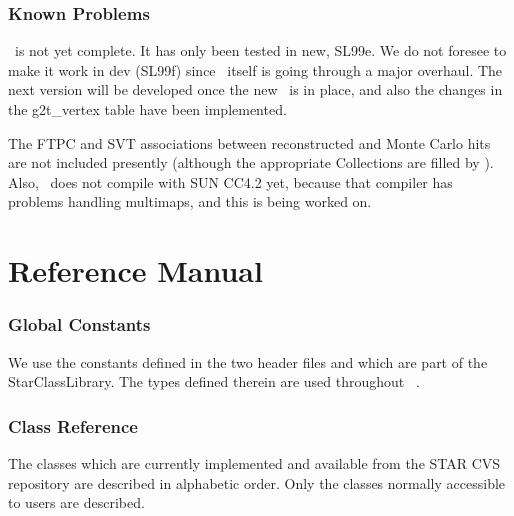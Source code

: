 \section{Known Problems} 

\StAssociationMaker\ is not yet complete.  
It has only been tested in new, SL99e.  We do not foresee
to make it work in dev (SL99f) since \StEvent\ itself is going through a major
overhaul.  The next version will be developed once the new \StEvent\
is in place, and also the changes in the g2t\_vertex table have been
implemented.

The FTPC and SVT associations between reconstructed and Monte Carlo
hits are not included presently (although the appropriate Collections are
filled by \name{StMcEventMaker} ). 
Also, \StAssociationMaker\ does not compile with SUN CC4.2 yet, because
that compiler has problems handling multimaps, and this is being worked on.


\clearpage

%
%
\part{Reference Manual}
\label{refman}
\clearpage


\section{Global Constants}

We use the constants defined in the two header files
  and
 which are part of the StarClassLibrary.
The types defined therein are used
throughout \StMcEvent\ .



\section{Class Reference}
The classes which are currently implemented and available from the
STAR CVS repository are described in alphabetic order.  Only the
classes normally accessible to users are described.

